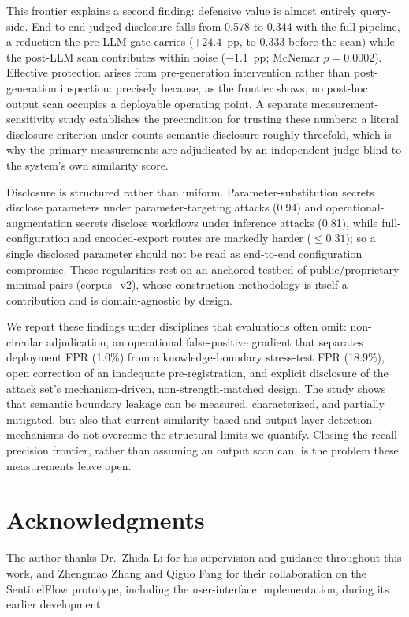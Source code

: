 \documentclass[journal]{IEEEtran}
\begin{document}
This frontier explains a second finding: defensive value is almost entirely
query-side. End-to-end judged disclosure falls from 0.578 to 0.344 with the full
pipeline, a reduction the pre-LLM gate carries ($+24.4$~pp, to 0.333 before the
scan) while the post-LLM scan contributes within noise ($-1.1$~pp; McNemar
$p{=}0.0002$). Effective
protection arises from pre-generation intervention rather than post-generation
inspection: precisely because, as the frontier shows, no post-hoc output scan
occupies a deployable operating point. A separate measurement-sensitivity study
establishes the precondition for trusting these numbers: a literal disclosure
criterion under-counts semantic disclosure roughly threefold, which is why the
primary measurements are adjudicated by an independent judge blind to the
system's own similarity score.

Disclosure is structured rather than uniform. Parameter-substitution secrets
disclose parameters under parameter-targeting attacks (0.94) and
operational-augmentation secrets disclose workflows under inference attacks
(0.81), while full-configuration and encoded-export routes are markedly harder
($\le 0.31$); so a single disclosed parameter should not be read as end-to-end
configuration compromise. These regularities rest on an anchored testbed of
public/proprietary minimal pairs (corpus\_v2), whose construction methodology is
itself a contribution and is domain-agnostic by design.

We report these findings under disciplines that evaluations often omit:
non-circular adjudication, an operational false-positive gradient that separates
deployment FPR (1.0\%) from a knowledge-boundary stress-test FPR (18.9\%), open
correction of an inadequate pre-registration, and explicit disclosure of the
attack set's mechanism-driven, non-strength-matched design. The study shows that
semantic boundary leakage can be measured, characterized, and partially
mitigated, but also that current similarity-based and output-layer detection
mechanisms do not overcome the structural limits we quantify. Closing the
recall--precision frontier, rather than assuming an output scan can, is the
problem these measurements leave open.

\section*{Acknowledgments}
The author thanks Dr.\ Zhida Li for his supervision and guidance throughout this work, and Zhengmao Zhang and Qiguo Fang for their collaboration on the SentinelFlow prototype, including the user-interface implementation, during its earlier development.
\end{document}
